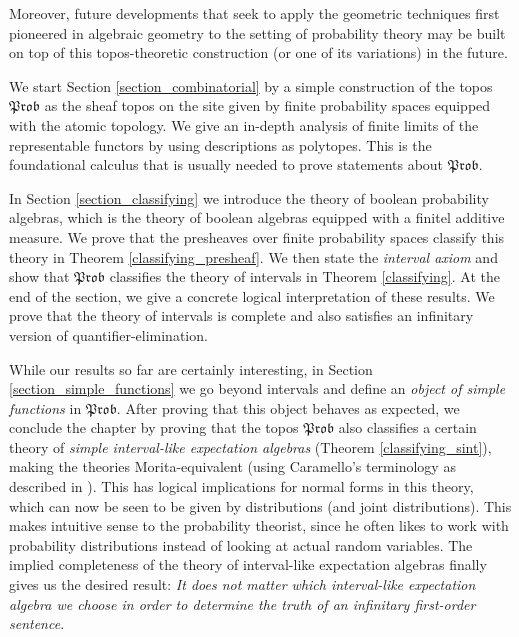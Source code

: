 \documentclass[a4paper]{amsproc}
\theoremstyle{plain}
\theoremstyle{definition}
\theoremstyle{remark}
\numberwithin{equation}{section}
\newcommand{\Prob}{\mathfrak{Prob}}
\begin{document}
Moreover, future developments that seek to apply the geometric techniques first pioneered in algebraic geometry to the setting of probability theory may be built on top of this topos-theoretic construction (or one of its variations) in the future.


We start Section \ref{section_combinatorial} by a simple construction of the topos $\Prob$ as the sheaf topos on the site given by finite probability spaces equipped with the atomic topology. We give an in-depth analysis of finite limits of the representable functors by using descriptions as polytopes. This is the foundational calculus that is usually needed to prove statements about $\Prob$.

In Section \ref{section_classifying} we introduce the theory of boolean probability algebras, which is the theory of boolean algebras equipped with a finitel additive measure. We prove that the presheaves over finite probability spaces classify this theory in Theorem \ref{classifying_presheaf}. We then state the \emph{interval axiom} and show that $\Prob$ classifies the theory of intervals in Theorem \ref{classifying}. At the end of the section, we give a concrete logical interpretation of these results. We prove that the theory of intervals is complete and also satisfies an infinitary version of quantifier-elimination.

While our results so far are certainly interesting, in Section \ref{section_simple_functions} we go beyond intervals and define an \emph{object of simple functions} in $\Prob$. After proving that this object behaves as expected, we conclude the chapter by proving that the topos $\Prob$ also classifies a certain theory of \emph{simple interval-like expectation algebras} (Theorem \ref{classifying_sint}), making the theories Morita-equivalent (using Caramello's terminology as described in \cite{caramello2018theories}). This has logical implications for normal forms in this theory, which can now be seen to be given by distributions (and joint distributions). This makes intuitive sense to the probability theorist, since he often likes to work with probability distributions instead of looking at actual random variables. The implied completeness of the theory of interval-like expectation algebras finally gives us the desired result: \emph{It does not matter which interval-like expectation algebra we choose in order to determine the truth of an infinitary first-order sentence}.

\end{document}
